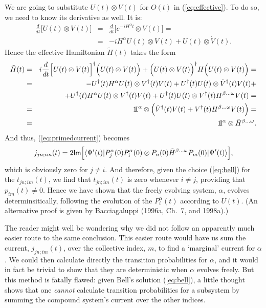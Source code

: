 \documentclass[12pt]{article}
\newcommand{\be}{\vspace*{6pt} \begin{equation}}
\newcommand{\ee}{\vspace*{10pt} \end{equation}}
\newcommand{\ident}{1\!{\rm I}}                                 %
\newcommand{\ga}{\alpha}                                        %
\newcommand{\gb}{\beta}                                         %
\newcommand{\gw}{\omega}                                        %
\renewcommand{\Im}{\mbox{{\sf Im}}}                             %
\newcommand{\bra}[1]{\langle #1\vert}                           %
\newcommand{\ket}[1]{\vert #1\rangle}                           %
\begin{document}
We are going to substitute $U(t) \otimes V(t)$ for $O(t)$ in 
(\ref{eq:effective}).  To do so, we need to know its derivative as 
well.  It is:
\begin{eqnarray}
  {\displaystyle \frac{d}{dt} \Big[ U(t) \otimes V(t) \Big] }   
  & = &
  {\displaystyle  \frac{d}{dt} \Big[ e^{-iH^{\ga}t} \otimes V(t)
  \Big]= } \nonumber \\[1ex]
  \ & = &  -iH^{\ga}U(t) \otimes V(t) + U(t) \otimes \dot{V}(t).
  \label{eq:derivative}
\end{eqnarray}
Hence the effective Hamiltonian $\tilde{H}(t)$ takes the form
\begin{eqnarray}
  \tilde{H}(t)  & = &
  i\frac{d}{dt}\Big[U(t)\otimes V(t)\Big]^{\dagger} 
  \Big(U(t)\otimes V(t)\Big) + \Big(U(t)\otimes V(t)\Big)^{\dagger} 
  H \Big(U(t)\otimes V(t)\Big) =
  \nonumber   \\
  & = &
  - U^{\dagger}(t)H^{\ga}U(t) \otimes V^{\dagger}(t)V(t)
  + U^{\dagger}(t)U(t) \otimes \dot{V}^{\dagger}(t)V(t)+
  \nonumber    \\
  &   &
  + U^{\dagger}(t)H^{\ga}U(t) \otimes V^{\dagger}(t)V(t)
  + U^{\dagger}(t)U(t) \otimes V^{\dagger}(t)H^{\gb\ldots\gw}V(t)=
  \nonumber    \\
  & = &
  \ident^{\ga} \otimes \Big(\dot{V}^{\dagger}(t)V(t)
  + V^{\dagger}(t)H^{\gb\ldots\gw}V(t)\Big)=
  \nonumber     \\
  & = &
  \ident^{\ga} \otimes \tilde{H}^{\gb\ldots\gw}.
  \label{eq:effective2}
\end{eqnarray}
And thus, (\ref{eq:primedcurrent}) becomes
\be
  j_{jn;im}(t) = 2 \Im \Big[\bra{\Psi'(t)} P^{\ga}_j(0)P^{\ga}_i(0) 
  \otimes  P_n(0)\tilde{H}^{\gb\ldots\gw}P_m(0) \ket{\Psi'(t)}\Big],
  \label{eq:zerocurrent}
\ee
which is obviously zero for $j\neq i$.  And therefore, given the 
choice (\ref{eq:bell}) for the $t_{jn;im}(t)$, we find that 
$t_{jn;im}(t)$ is zero whenever $i \neq j$, providing that $p_{im}(t)
\neq 0$.  Hence we have shown that the freely evolving system, $\ga$,
evolves determinsitically, following the evolution of the
$P^{\ga}_{i}(t)$ according to $U(t)$. (An alternative proof is given by
Bacciagaluppi (1996a, Ch.~7, and 1998a).)

The reader might well be wondering why we did not follow an apparently 
much easier route to the same conclusion.  This easier route would 
have us sum the current, $j_{jn;im}(t)$, over the collective index, 
$m$, to find a `marginal' current for $\ga$.  We could then calculate 
directly the transition probabilities for $\ga$, and it would in fact 
be trivial to show that they are deterministic when $\ga$ evolves 
freely.  But this method is fatally flawed: given Bell's solution 
(\ref{eq:bell}), a little thought shows that one {\it cannot} 
calculate transition probabilities for a subsystem by summing the 
compound system's current over the other indices.
\end{document}
